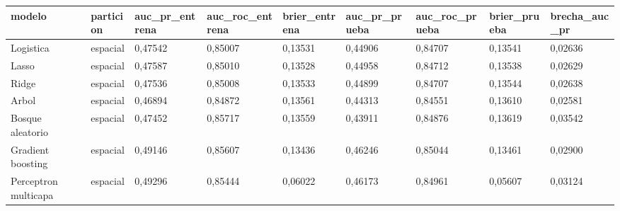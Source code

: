 \begin{tabular}{lllllllll}
\toprule
modelo & particion & auc\_pr\_entrena & auc\_roc\_entrena & brier\_entrena & auc\_pr\_prueba & auc\_roc\_prueba & brier\_prueba & brecha\_auc\_pr \\
\midrule
Logistica & espacial & 0{,}47542 & 0{,}85007 & 0{,}13531 & 0{,}44906 & 0{,}84707 & 0{,}13541 & 0{,}02636 \\
Lasso & espacial & 0{,}47587 & 0{,}85010 & 0{,}13528 & 0{,}44958 & 0{,}84712 & 0{,}13538 & 0{,}02629 \\
Ridge & espacial & 0{,}47536 & 0{,}85008 & 0{,}13533 & 0{,}44899 & 0{,}84707 & 0{,}13544 & 0{,}02638 \\
Arbol & espacial & 0{,}46894 & 0{,}84872 & 0{,}13561 & 0{,}44313 & 0{,}84551 & 0{,}13610 & 0{,}02581 \\
Bosque aleatorio & espacial & 0{,}47452 & 0{,}85717 & 0{,}13559 & 0{,}43911 & 0{,}84876 & 0{,}13619 & 0{,}03542 \\
Gradient boosting & espacial & 0{,}49146 & 0{,}85607 & 0{,}13436 & 0{,}46246 & 0{,}85044 & 0{,}13461 & 0{,}02900 \\
Perceptron multicapa & espacial & 0{,}49296 & 0{,}85444 & 0{,}06022 & 0{,}46173 & 0{,}84961 & 0{,}05607 & 0{,}03124 \\
\bottomrule
\end{tabular}
